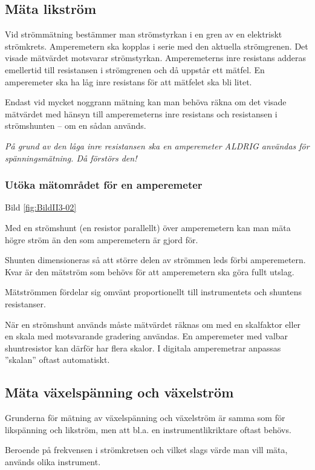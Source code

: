 \subsection{Mäta likström}

Vid strömmätning bestämmer man strömstyrkan i en gren av en elektriskt
strömkrets. Amperemetern ska kopplas i serie med den aktuella
strömgrenen. Det visade mätvärdet motsvarar strömstyrkan.
Amperemeterns inre resistans adderas emellertid till resistansen i
strömgrenen och då uppstår ett mätfel. En amperemeter ska ha låg
inre resistans för att mätfelet ska bli litet.

Endast vid mycket noggrann mätning kan man behöva räkna om det visade
mätvärdet med hänsyn till amperemeterns inre resistans och resistansen
i strömshunten -- om en sådan används.

\emph{På grund av den låga inre resistansen ska en amperemeter
  ALDRIG användas för spänningsmätning. Då förstörs den!}

\subsubsection{Utöka mätområdet för en amperemeter}

Bild \ref{fig:BildII3-02}

Med en strömshunt (en resistor parallellt) över amperemetern kan man
mäta högre ström än den som amperemetern är gjord för.

Shunten dimensioneras så att större delen av strömmen leds förbi
amperemetern. Kvar är den mätström som behövs för att amperemetern
ska göra fullt utslag.

Mätströmmen fördelar sig omvänt proportionellt till instrumentets och
shuntens resistanser.

När en strömshunt används måste mätvärdet räknas om med en skalfaktor
eller en skala med motsvarande gradering användas. En amperemeter med
valbar shuntresistor kan därför har flera skalor. I digitala
amperemetrar anpassas ''skalan'' oftast automatiskt.

\subsection{Mäta växelspänning och växelström}

Grunderna för mätning av växelspänning och växelström är samma som för
likspänning och likström, men att bl.a. en instrumentlikriktare oftast
behövs.

Beroende på frekvensen i strömkretsen och vilket slags värde man vill
mäta, används olika instrument.

